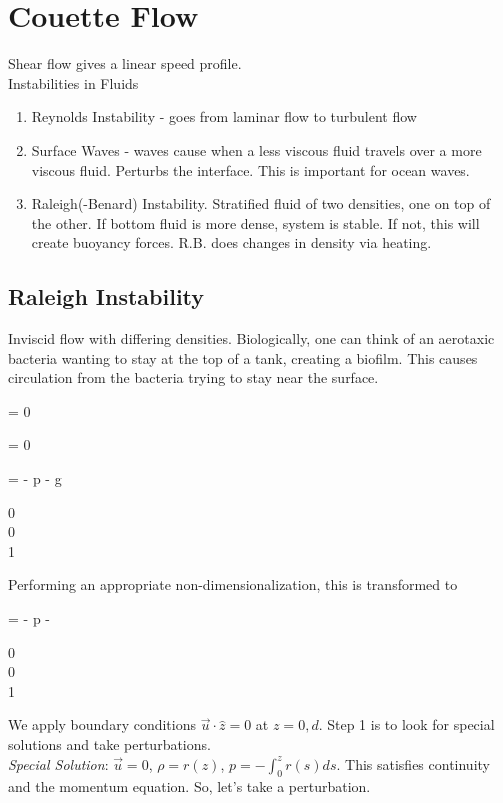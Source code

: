 \documentclass[]{article}
\numberwithin{equation}{section}		%
\let\[\equation
\let\]\endequation
\begin{document}
\section{Couette Flow}
Shear flow gives a linear speed profile.  \\
Instabilities in Fluids
\begin{enumerate}
	\item Reynolds Instability - goes from laminar flow to turbulent flow
	\item Surface Waves - waves cause when a less viscous fluid travels over a more viscous fluid. Perturbs the
		interface. This is important for ocean waves.
	\item Raleigh(-Benard) Instability. Stratified fluid of two densities, one on top of the other. If bottom fluid is more
		dense, system is stable. If not, this will create buoyancy forces. R.B. does changes in density via heating.
\end{enumerate}

\subsection{Raleigh Instability} Inviscid flow with differing densities. Biologically, one can think of an aerotaxic bacteria
wanting to stay at the top of a tank, creating a biofilm. This causes circulation from the bacteria trying to stay near the surface.

\[
\nabla \cdot {} = 0
\]

\[
	 = 0
\]

\[
	\rho {}  = - \nabla p - \rho g \begin{bmatrix}	0\\0\\1	\end{bmatrix}
\]

Performing an appropriate non-dimensionalization, this is transformed to

\[
	  = - \nabla p - \rho \begin{bmatrix}	0\\0\\1	\end{bmatrix}
\]

We apply boundary conditions $\vec{u}\cdot \hat{z} = 0$ at $z = 0, d$. Step 1 is to look for special solutions and take
perturbations.  \\
\emph{Special Solution}: $\vec{u} = 0$, $\rho = r(z)$, $p = - \int_0^z r(s)ds$. This satisfies continuity and the momentum
equation.  So, let's take a perturbation.
\end{document}
